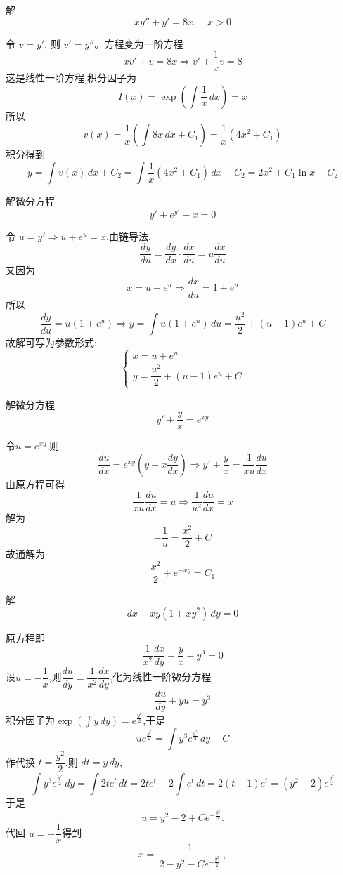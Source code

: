 \begin{questions}
    \question 解
    \[
    x y'' + y' = 8x,\quad x>0
    \]
    \begin{solution}
        令 $v=y'$, 则 $v'=y''$。方程变为一阶方程
        \[
        x v' + v = 8x \Rightarrow v' + \frac{1}{x} v = 8
        \]
        这是线性一阶方程,积分因子为
        \[
        I(x)=\exp{\left(\int \frac{1}{x}\,dx\right)} =x
        \]
        所以
        \[
        v(x)=\frac{1}{x}\left(\int 8x\,dx + C_1\right)=\frac{1}{x}(4x^2+C_1)
        \]
        积分得到
        \[
        y=\int v(x)\,dx + C_2 = \int \frac{1}{x}(4x^2+C_1)\,dx + C_2=2x^2 + C_1\ln x + C_2
        \]
    \end{solution}

    \question 解微分方程
    \[
    y' + e^{y'} - x = 0
    \]
    \begin{solution}
        令 $u = y' \Rightarrow u + e^u = x$,由链导法,
        \[
        \frac{dy}{du}=\frac{dy}{dx}\cdot\frac{dx}{du}=u\frac{dx}{du}
        \]
        又因为
        \[
        x = u + e^u \Rightarrow \frac{dx}{du} = 1 + e^u
        \]
        所以
        \[
        \frac{dy}{du} = u(1 + e^u) \Rightarrow y = \int u(1 + e^u)\,du = \frac{u^2}{2} + (u - 1)e^u + C
        \]
        故解可写为参数形式:
        \[
        \begin{cases}
        x = u + e^u\\[4pt]
        y = \dfrac{u^2}{2} + (u - 1)e^u + C
        \end{cases}
        \]
    \end{solution}

    \question 解微分方程
    \[
    y' + \frac{y}{x} = e^{xy}
    \]
    \begin{solution}
        令$u = e^{xy}$,则
        \[
        \frac{du}{dx} = e^{xy}\left( y + x\frac{dy}{dx} \right)
        \Rightarrow y' + \frac{y}{x} = \frac{1}{xu}\frac{du}{dx}
        \]
        由原方程可得
        \[
        \frac{1}{xu}\frac{du}{dx}=u \Rightarrow \frac{1}{u^2}\frac{du}{dx} = x
        \]
        解为
        \[
        -\frac{1}{u} = \frac{x^2}{2} + C 
        \]
        故通解为
        \[
        \frac{x^2}{2} + e^{-xy} = C_1
        \]
    \end{solution}

    \question 解
    \[
    dx - xy(1+xy^2) \,dy =0
    \]
    \begin{solution}
        原方程即
        \[
        \frac{1}{x^2}\frac{dx}{dy} - \frac{y}{x} - y^3 = 0
        \]
        设$u=-\dfrac{1}{x}$,则$\dfrac{du}{dy}=\dfrac{1}{x^2}\dfrac{dx}{dy}$,化为线性一阶微分方程
        \[
        \frac{du}{dy}+yu=y^3
        \]
        积分因子为$\displaystyle \exp{\left(\int y\,dy\right)}=e^{\frac{y^2}{2}}$,于是
        \[
        u e^{\frac{y^2}{2}} = \int y^3 e^{\frac{y^2}{2}}\,dy + C
        \]
        作代换 $t=\dfrac{y^2}{2}$,则 $dt=y\,dy$,
        \[
        \int y^3 e^{\frac{y^2}{2}}\,dy = \int 2t e^{t}\,dt
        = 2te^t-2\int e^t \, dt = 2(t-1)e^{t} = (y^2-2)e^{\frac{y^2}{2}} 
        \]
        于是
        \[
        u = y^2 - 2 + C e^{-\frac{y^2}{2}}.
        \]
        代回 $u=-\dfrac{1}{x}$得到
        \[
        x = \frac{1}{\,2 - y^2 - C e^{-\frac{y^2}{2}}\,},
        \]
    \end{solution}


\end{questions}
